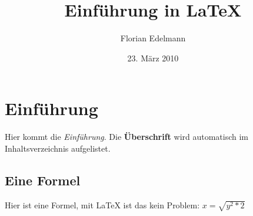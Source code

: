 \documentclass[12pt]{article}
\title{Einführung in LaTeX}
\author{Florian Edelmann}
\date{23. März 2010}
\begin{document}
\maketitle
\tableofcontents

\section{Einführung}
Hier kommt die \textit{Einführung}. 
Die \textbf{Überschrift} wird automatisch im Inhaltsverzeichnis aufgelistet.
 
\subsection{Eine Formel}
Hier ist eine Formel, mit \LaTeX{} ist das kein Problem: \(x=\sqrt{y^2*2}\)
\end{document}
